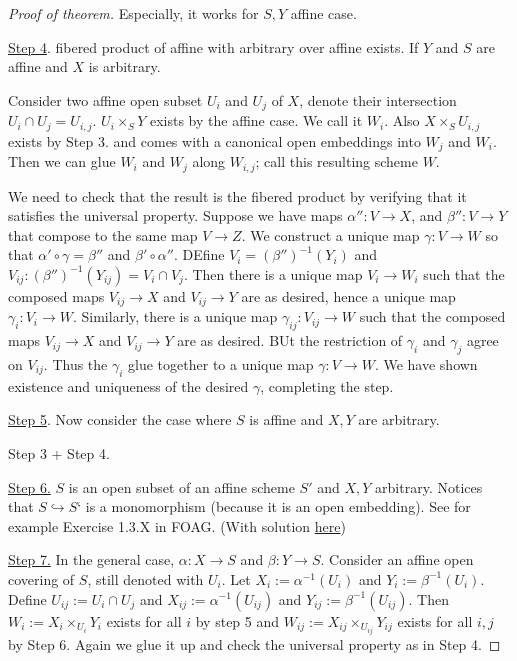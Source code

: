 \documentclass[11pt]{article}
\theoremstyle{definition}
\newcommand{\lrta}{\longrightarrow}
\newcommand{\inj}{\hookrightarrow}
\begin{document}
\begin{proof}[Proof of theorem]
Especially, it works for $S,Y$ affine case. 

\underline{Step 4}. fibered product of affine with arbitrary over affine exists. If $Y$ and $S$ are affine and $X$ is arbitrary.

Consider two affine open subset $U_i$ and $U_j$ of $X$, denote their intersection $U_i\cap U_j=U_{i,j}$.  $U_i\times_S Y$ exists by the affine case. We call it $W_i$. Also $X\times_S U_{i,j}$ exists by Step 3. and comes with a canonical open embeddings into $W_j$ and $W_i$. Then we can glue $W_i$ and $W_j$ along $W_{i,j}$; call this resulting scheme $W$.

We need to check that the result is the fibered product by verifying that it satisfies the universal property. Suppose we have maps $\alpha'':V\lrta X$, and $\beta'':V\lrta Y$ that compose to the same map $V\lrta Z$. We construct a unique map $\gamma:V\lrta W$ so that $\alpha'\circ \gamma=\beta''$ and $\beta'\circ \alpha''$. DEfine $V_i=(\beta'')^{-1}(Y_i)$ and $V_{ij}:(\beta'')^{-1}(Y_{ij})=V_i\cap V_j$. Then there is a unique map $V_i\lrta W_i$ such that the composed maps $V_{ij}\lrta X$ and $V_{ij}\lrta Y$ are as desired, hence a unique map $\gamma_i:V_i\lrta W$. Similarly, there is a unique map $\gamma_{ij}:V_{ij}\lrta W$ such that the composed maps $V_{ij}\lrta X$ and $V_{ij}\lrta Y$ are as desired. BUt the restriction of $\gamma_{i}$ and $\gamma_{j}$ agree on $V_{ij}$. Thus the $\gamma_i$ glue together to a unique map $\gamma:V\lrta W$. We have shown existence and uniqueness of the desired $\gamma$, completing the step.

\underline{Step 5}. Now consider the case where $S$ is affine and $X, Y$ are arbitrary. 

Step 3 + Step 4.

\underline{Step 6.} $S$ is an open subset of an affine scheme $S'$ and $X,Y$ arbitrary. Notices that $S\inj S‘$ is a monomorphism (because it is an open embedding). See for example Exercise 1.3.X in FOAG. (With solution \href{https://ldxiao.github.io/images/FOAG.pdf}{here})

\underline{Step 7.} In the general case, $\alpha:X\lrta S$ and $\beta:Y\lrta S$. Consider an affine open covering of $S$, still denoted with $U_i$. Let $X_i:=\alpha^{-1}(U_i)$ and $Y_i:=\beta^{-1}(U_i)$. Define $U_{ij}:=U_i\cap U_j$ and $X_{ij}:=\alpha^{-1}(U_{ij})$ and $Y_{ij}:=\beta^{-1}(U_{ij})$. Then $W_i:=X_i\times_{U_i}Y_i$ exists for all $i$ by step 5 and $W_{ij}:=X_{ij}\times_{U_{ij}}Y_{ij}$ exists for all $i,j$ by Step 6. Again we glue it up and check the universal property as in Step 4.
\end{proof}
\end{document}
